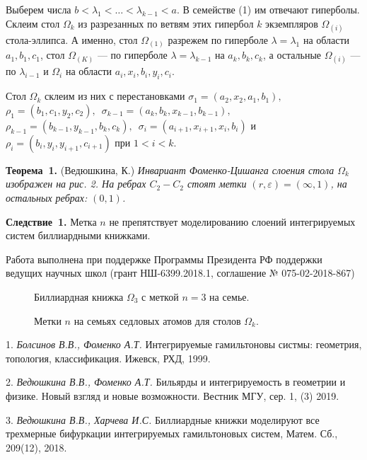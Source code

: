 Выберем числа $b < \lambda_1 < \dots < \lambda_{k-1} < a$. В семействе (1) им отвечают гиперболы. Склеим стол $\Omega_k$ из разрезанных по ветвям этих гипербол $k$ экземпляров $\Omega_{(i)}$ стола-эллипса. А именно, стол $\Omega_{(1)}$ разрежем по гиперболе $\lambda = \lambda_1$ на области $a_1, b_1, c_1$, стол $\Omega_{(K)}$ --- по гиперболе $\lambda = \lambda_{k-1}$ на $a_k, b_k, c_k$, а остальные $\Omega_{(i)}$ --- по $\lambda_{i-1}$ и $\Omega_i$ на области $a_i, x_i, b_i, y_i, c_i$.

Стол $\Omega_k$ склеим из них с перестановками $\sigma_1 = (a_2, x_2, a_1, b_1),$\, $\rho_1 = (b_1, c_1, y_2, c_2),$\, $\sigma_{k-1} = (a_{k}, b_{k}, x_{k-1}, b_{k-1}) ,$\, $\rho_{k-1} = (b_{k-1}, y_{k-1}, b_{k}, c_{k}),$\, $\sigma_i = (a_{i+1}, x_{i+1}, x_i, b_i)$ и $\rho_i = (b_{i}, y_{i}, y_{i+1}, c_{i+1})$ при $1 < i < k$.

\textbf{Теорема~1.} (Ведюшкина, К.) {\it Инвариант Фоменко-Цишанга слоения стола $\Omega_k$ изображен на рис. 2. На ребрах $C_2 - C_2$ стоят метки $(r, \varepsilon) = (\infty, 1)$, на остальных ребрах: $(0, 1)$.}

\textbf{Следствие~1.} Метка $n$ не препятствует моделированию слоений интегрируемых систем биллиардными книжками.

Работа выполнена при поддержке Программы Президента РФ поддержки ведущих научных школ (грант НШ-6399.2018.1, соглашение № 075-02-2018-867)


 

 \begin{figure}[h!]
\caption{Биллиардная книжка $\Omega_3$ с меткой $n = 3$ на семье.} \label{WildMol}
 \end{figure}


 \begin{figure}[h!]
\caption{Метки $n$ на семьях седловых атомов для столов $\Omega_k$.} \label{WildMol}
 \end{figure}









\litlist

1. {\it Болсинов В.В., Фоменко А.Т.} Интегрируемые гамильтоновы систмы: геометрия, топология, классификация. Ижевск, РХД, 1999. 


2. {\it Ведюшкина В.В., Фоменко А.Т.} Бильярды и интегрируемость в геометрии и физике. Новый взгляд и новые возможности. Вестник МГУ, сер. 1, (3) 2019.

3. {\it Ведюшкина В.В., Харчева И.С.} Биллиардные книжки моделируют все трехмерные бифуркации интегрируемых гамильтоновых систем, Матем. Сб., 209(12), 2018.

